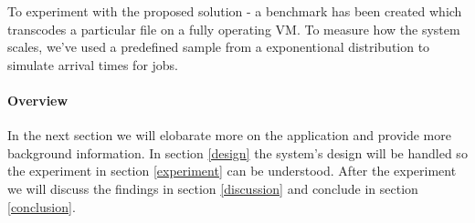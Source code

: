 To experiment with the proposed solution - a benchmark has been
created which transcodes a particular file on a fully operating VM. To
measure how the system scales, we've used a predefined sample from a
exponentional distribution to simulate arrival times for jobs.

\paragraph{Overview}
In the next section we will elobarate more on the application and
provide more background information. In section \ref{design} the
system's design will be handled so the experiment in section
\ref{experiment} can be understood. After the experiment we will
discuss the findings in section \ref{discussion} and conclude in
section \ref{conclusion}.

